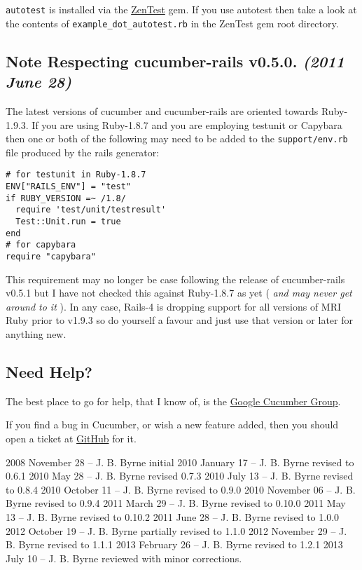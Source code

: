 \verb+autotest+ is installed via the \href{http://www.zenspider.com/ZSS/Products/ZenTest/}{ZenTest} gem.  If you use autotest then take a look at the contents of \verb+example_dot_autotest.rb+ in the ZenTest gem root directory.

\subsection{Note Respecting cucumber-rails v0.5.0. \emph{(2011 June 28)}}

The latest versions of cucumber and cucumber-rails are oriented towards Ruby-1.9.3.  If you are using Ruby-1.8.7 and you are employing testunit or Capybara then one or both of the following may need to be added to the \verb+support/env.rb+ file produced by the rails generator:
\begin{verbatim}
# for testunit in Ruby-1.8.7
ENV["RAILS_ENV"] = "test"
if RUBY_VERSION =~ /1.8/
  require 'test/unit/testresult'
  Test::Unit.run = true
end
# for capybara
require "capybara"

\end{verbatim}

This requirement may no longer be case following the release of cucumber-rails v0.5.1 but I have not checked this against Ruby-1.8.7 as yet ( \emph{and may never get around to it} ).  In any case, Rails-4 is dropping support for all versions of MRI Ruby prior to v1.9.3 so do yourself a favour and just use that version or later for anything new.

\subsection{Need Help?}

The best place to go for help, that I know of, is the \href{http://groups.google.com/group/cukes}{Google Cucumber Group}.

If you find a bug in Cucumber, or wish a new feature added, then you should open a ticket at \href{https://github.com/cucumber/cucumber/issues}{GitHub} for it.

2008 November 28 -- J. B. Byrne initial
2010 January 17 -- J. B. Byrne revised to 0.6.1
2010 May 28 -- J. B. Byrne revised 0.7.3
2010 July 13 -- J. B. Byrne revised to 0.8.4
2010 October 11 -- J. B. Byrne revised to 0.9.0
2010 November 06 -- J. B. Byrne revised to 0.9.4
2011 March 29 -- J. B. Byrne revised to 0.10.0
2011 May 13 -- J. B. Byrne revised to 0.10.2
2011 June 28 -- J. B. Byrne revised to 1.0.0
2012 October 19 -- J. B. Byrne partially revised to 1.1.0
2012 November 29 -- J. B. Byrne revised to 1.1.1
2013 February 26 -- J. B. Byrne revised to 1.2.1
2013 July 10 -- J. B. Byrne reviewed with minor corrections.

